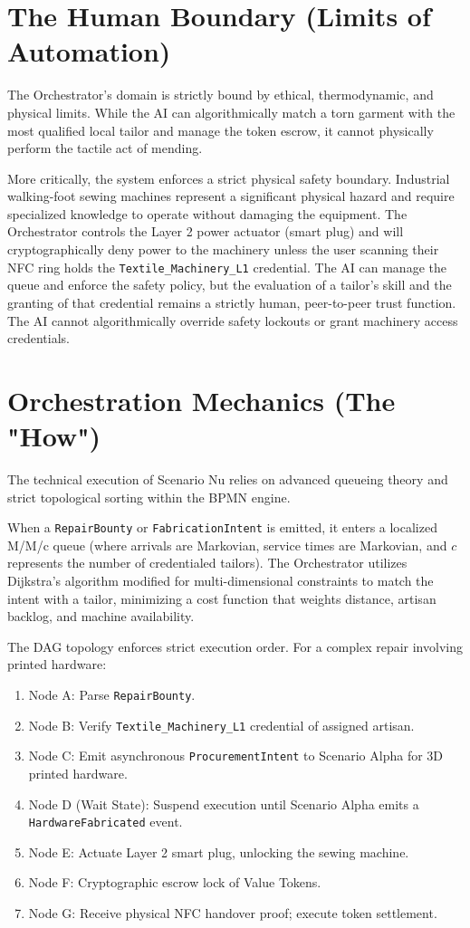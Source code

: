 \section{The Human Boundary (Limits of Automation)}
The Orchestrator's domain is strictly bound by ethical, thermodynamic, and physical limits. While the AI can algorithmically match a torn garment with the most qualified local tailor and manage the token escrow, it cannot physically perform the tactile act of mending. 

More critically, the system enforces a strict physical safety boundary. Industrial walking-foot sewing machines represent a significant physical hazard and require specialized knowledge to operate without damaging the equipment. The Orchestrator controls the Layer 2 power actuator (smart plug) and will cryptographically deny power to the machinery unless the user scanning their NFC ring holds the \texttt{Textile\_Machinery\_L1} credential. The AI can manage the queue and enforce the safety policy, but the evaluation of a tailor's skill and the granting of that credential remains a strictly human, peer-to-peer trust function. The AI cannot algorithmically override safety lockouts or grant machinery access credentials.

\section{Orchestration Mechanics (The "How")}
The technical execution of Scenario Nu relies on advanced queueing theory and strict topological sorting within the BPMN engine. 

When a \texttt{RepairBounty} or \texttt{FabricationIntent} is emitted, it enters a localized M/M/c queue (where arrivals are Markovian, service times are Markovian, and $c$ represents the number of credentialed tailors). The Orchestrator utilizes Dijkstra's algorithm modified for multi-dimensional constraints to match the intent with a tailor, minimizing a cost function that weights distance, artisan backlog, and machine availability.

The DAG topology enforces strict execution order. For a complex repair involving printed hardware:
\begin{enumerate}
    \item Node A: Parse \texttt{RepairBounty}.
    \item Node B: Verify \texttt{Textile\_Machinery\_L1} credential of assigned artisan.
    \item Node C: Emit asynchronous \texttt{ProcurementIntent} to Scenario Alpha for 3D printed hardware.
    \item Node D (Wait State): Suspend execution until Scenario Alpha emits a \texttt{HardwareFabricated} event.
    \item Node E: Actuate Layer 2 smart plug, unlocking the sewing machine.
    \item Node F: Cryptographic escrow lock of Value Tokens.
    \item Node G: Receive physical NFC handover proof; execute token settlement.
\end{enumerate}

